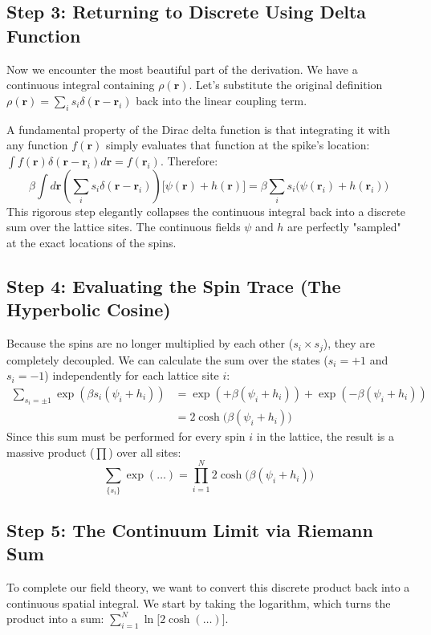 \documentclass[12pt,a4paper]{article}
\begin{document}
\subsection{Step 3: Returning to Discrete Using Delta Function}
Now we encounter the most beautiful part of the derivation. We have a continuous integral containing $\rho(\mathbf{r})$. Let's substitute the original definition $\rho(\mathbf{r}) = \sum_i s_i \delta(\mathbf{r} - \mathbf{r}_i)$ back into the linear coupling term.

A fundamental property of the Dirac delta function is that integrating it with any function $f(\mathbf{r})$ simply evaluates that function at the spike's location: $\int f(\mathbf{r}) \delta(\mathbf{r} - \mathbf{r}_i) d\mathbf{r} = f(\mathbf{r}_i)$. Therefore:
\begin{equation}
    \beta \int d\mathbf{r} \left( \sum_i s_i \delta(\mathbf{r} - \mathbf{r}_i) \right) \big[ \psi(\mathbf{r}) + h(\mathbf{r}) \big] = \beta \sum_i s_i \big( \psi(\mathbf{r}_i) + h(\mathbf{r}_i) \big)
\end{equation}
This rigorous step elegantly collapses the continuous integral back into a discrete sum over the lattice sites. The continuous fields $\psi$ and $h$ are perfectly "sampled" at the exact locations of the spins.

\subsection{Step 4: Evaluating the Spin Trace (The Hyperbolic Cosine)}
Because the spins are no longer multiplied by each other ($s_i \times s_j$), they are completely decoupled. We can calculate the sum over the states ($s_i = +1$ and $s_i = -1$) independently for each lattice site $i$:
\begin{align}
    \sum_{s_i = \pm 1} \exp\left( \beta s_i (\psi_i + h_i) \right) &= \exp\left( +\beta (\psi_i + h_i) \right) + \exp\left( -\beta (\psi_i + h_i) \right) \nonumber \\
    &= 2\cosh\big(\beta(\psi_i + h_i)\big)
\end{align}
Since this sum must be performed for every spin $i$ in the lattice, the result is a massive product ($\prod$) over all sites:
\begin{equation}
    \sum_{\{s_i\}} \exp(\dots) = \prod_{i=1}^N 2\cosh\big(\beta(\psi_i + h_i)\big)
\end{equation}

\subsection{Step 5: The Continuum Limit via Riemann Sum}
To complete our field theory, we want to convert this discrete product back into a continuous spatial integral. We start by taking the logarithm, which turns the product into a sum: $\sum_{i=1}^N \ln \big[ 2\cosh(\dots) \big]$.
\end{document}
